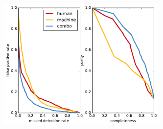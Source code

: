 \documentclass[a4paper,fleqn,usenatbib]{mnras}
\begin{document}
\begin{figure}
   \includegraphics[width=84mm]{figs/roc.pdf}
   \caption{} 
   \label{fig:roc} 
\end{figure}

\bsp	%
\label{lastpage}
\end{document}

